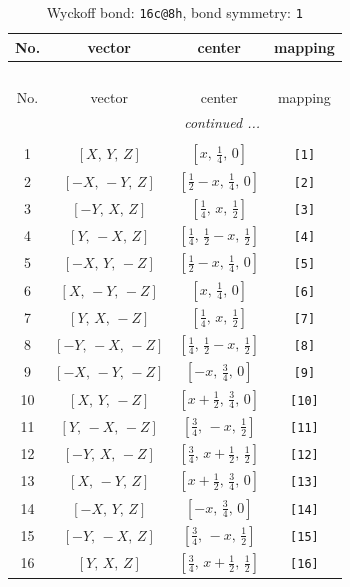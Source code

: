 \documentclass[fleqn,8pt]{jsarticle}
\begin{document}
\begin{longtable}{cccc}
\caption{Wyckoff bond: {\tt 16c@8h}, bond symmetry: {\tt 1}}
 \\
 \hline \hline
No. & vector & center & mapping \\ \hline \endfirsthead

\multicolumn{3}{l}{\tablename\ \thetable{}} \\
 \hline \hline
No. & vector & center & mapping \\ \hline \endhead

 \hline \hline
\multicolumn{3}{r}{\footnotesize\it continued ...} \\ \endfoot

 \hline \hline
\multicolumn{3}{r}{} \\ \endlastfoot

1 & $\left[ X,\, Y,\, Z \right]$ & $\left[ x,\, \frac{1}{4},\, 0 \right]$ & {\tt [1]} \\ \hline
2 & $\left[ - X,\, - Y,\, Z \right]$ & $\left[ \frac{1}{2} - x,\, \frac{1}{4},\, 0 \right]$ & {\tt [2]} \\ \hline
3 & $\left[ - Y,\, X,\, Z \right]$ & $\left[ \frac{1}{4},\, x,\, \frac{1}{2} \right]$ & {\tt [3]} \\ \hline
4 & $\left[ Y,\, - X,\, Z \right]$ & $\left[ \frac{1}{4},\, \frac{1}{2} - x,\, \frac{1}{2} \right]$ & {\tt [4]} \\ \hline
5 & $\left[ - X,\, Y,\, - Z \right]$ & $\left[ \frac{1}{2} - x,\, \frac{1}{4},\, 0 \right]$ & {\tt [5]} \\ \hline
6 & $\left[ X,\, - Y,\, - Z \right]$ & $\left[ x,\, \frac{1}{4},\, 0 \right]$ & {\tt [6]} \\ \hline
7 & $\left[ Y,\, X,\, - Z \right]$ & $\left[ \frac{1}{4},\, x,\, \frac{1}{2} \right]$ & {\tt [7]} \\ \hline
8 & $\left[ - Y,\, - X,\, - Z \right]$ & $\left[ \frac{1}{4},\, \frac{1}{2} - x,\, \frac{1}{2} \right]$ & {\tt [8]} \\ \hline
9 & $\left[ - X,\, - Y,\, - Z \right]$ & $\left[ - x,\, \frac{3}{4},\, 0 \right]$ & {\tt [9]} \\ \hline
10 & $\left[ X,\, Y,\, - Z \right]$ & $\left[ x + \frac{1}{2},\, \frac{3}{4},\, 0 \right]$ & {\tt [10]} \\ \hline
11 & $\left[ Y,\, - X,\, - Z \right]$ & $\left[ \frac{3}{4},\, - x,\, \frac{1}{2} \right]$ & {\tt [11]} \\ \hline
12 & $\left[ - Y,\, X,\, - Z \right]$ & $\left[ \frac{3}{4},\, x + \frac{1}{2},\, \frac{1}{2} \right]$ & {\tt [12]} \\ \hline
13 & $\left[ X,\, - Y,\, Z \right]$ & $\left[ x + \frac{1}{2},\, \frac{3}{4},\, 0 \right]$ & {\tt [13]} \\ \hline
14 & $\left[ - X,\, Y,\, Z \right]$ & $\left[ - x,\, \frac{3}{4},\, 0 \right]$ & {\tt [14]} \\ \hline
15 & $\left[ - Y,\, - X,\, Z \right]$ & $\left[ \frac{3}{4},\, - x,\, \frac{1}{2} \right]$ & {\tt [15]} \\ \hline
16 & $\left[ Y,\, X,\, Z \right]$ & $\left[ \frac{3}{4},\, x + \frac{1}{2},\, \frac{1}{2} \right]$ & {\tt [16]} \\
\end{longtable}
\end{document}
